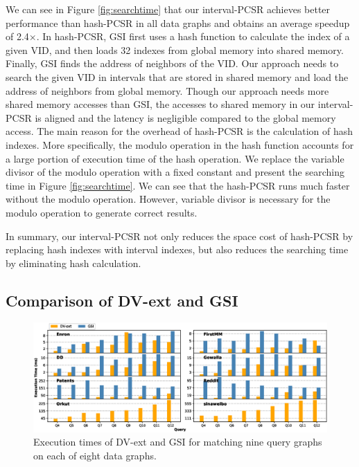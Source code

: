 We can see in Figure \ref{fig:searchtime} that our interval-PCSR achieves better performance than hash-PCSR in all data graphs and obtains an average speedup of 2.4$\times$. In hash-PCSR, GSI first uses a hash function to calculate the index of a given VID, and then loads 32 indexes from global memory into shared memory. Finally, GSI finds the address of neighbors of the VID. Our approach needs to search the given VID in intervals that are stored in shared memory and load the address of neighbors from global memory. Though our approach needs more shared memory accesses than GSI, the accesses to shared memory in our interval-PCSR is aligned and the latency is negligible compared to the global memory access. The main reason for the overhead of hash-PCSR is the calculation of hash indexes. More specifically, the modulo operation in the hash function accounts for a large portion of execution time of the hash operation. We replace the variable divisor of the modulo operation with a fixed constant and present the searching time in Figure \ref{fig:searchtime}. We can see that the hash-PCSR runs much faster without the modulo operation. However, variable divisor is necessary for the modulo operation to generate correct results.

In summary, our interval-PCSR not only reduces the space cost of hash-PCSR by replacing hash indexes with interval indexes, but also reduces the searching time by eliminating hash calculation.


\subsection{Comparison of DV-ext and GSI} \label{sec:comparegsi}
\begin{figure}
\centering
\includegraphics[width=\textwidth]{./figure/overperformance.eps}
\caption{Execution times of DV-ext and GSI for matching nine query graphs on each of eight data graphs.}	
\label{fig:overallperf}
\end{figure}

